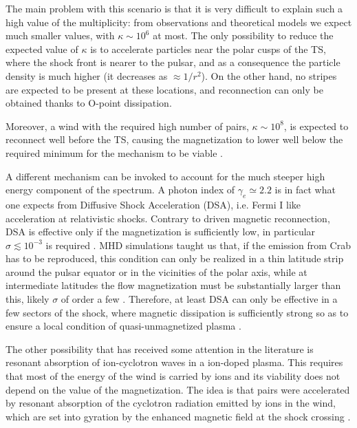 The main problem with this scenario is that it is very difficult to explain such a high value of the multiplicity: from observations and theoretical models we expect much smaller values, with $\kappa\sim 10^6$ at most. 
The only possibility to reduce the expected value of $\kappa$ is to accelerate particles near the polar cusps of the TS, where the shock front is nearer to the pulsar, and as a consequence the particle density is much higher (it decreases as $\approx 1/r^2$). 
On the other hand, no stripes are expected to be present at these locations, and reconnection can only be obtained thanks to O-point dissipation.

Moreover, a wind with the required high number of pairs, $\kappa\sim10^8$, is expected to reconnect well before the TS, causing the magnetization to lower well below the required minimum for the mechanism to be viable \citep{Amato:2014}. 


A different mechanism can be invoked to account for the much steeper high energy component of the spectrum. A photon index of $\gamma_e \simeq 2.2$ is in fact what one expects from Diffusive Shock Acceleration (DSA), i.e. Fermi I like acceleration at relativistic shocks. 
Contrary to driven magnetic reconnection, DSA is effective only if the magnetization is sufficiently low, in particular $\sigma \lesssim 10^{-3}$ is required \citep{Sironi:2009}. 
MHD simulations taught us that, if the emission from Crab has to be reproduced, this condition can only be realized in a thin latitude strip around the pulsar equator or in the vicinities of the polar axis, while at intermediate latitudes the flow magnetization must be substantially larger than this, likely $\sigma$ of order a few \citep{Komissarov:2013}. 
Therefore, at least DSA can only be effective in a few sectors of the shock, where magnetic dissipation is sufficiently strong so as to ensure a local condition of quasi-unmagnetized plasma \citep{Amato:2014}.

The other possibility that has received some attention in the literature is resonant absorption of ion-cyclotron waves in a ion-doped plasma. This requires that most of the energy of the wind is carried by ions and its viability does not depend on the value of the magnetization. 
The idea is that pairs were accelerated by resonant absorption of the cyclotron radiation emitted by ions in the wind, which are set into gyration by the enhanced magnetic field at the shock crossing \citep{Amato:2014}.


